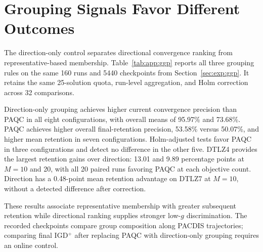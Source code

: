 \appendix
\section{Grouping Signals Favor Different Outcomes}
\label{app:ggp}
\setcounter{table}{0}
\renewcommand{\thetable}{\Alph{section}.\arabic{table}}
\renewcommand{\theHtable}{\Alph{section}.\arabic{table}}

The direction-only control separates directional convergence ranking from
representative-based membership. Table~\ref{tab:app:ggp} reports all three
grouping rules on the same 160 runs and 5440 checkpoints from
Section~\ref{sec:exp:ggp}. It retains the same 25-solution quota, run-level
aggregation, and Holm correction across 32 comparisons.

Direction-only grouping achieves higher current convergence precision than
PAQC in all eight configurations, with overall means of 95.97\% and 73.68\%.
PAQC achieves higher overall final-retention precision, 53.58\% versus 50.07\%,
and higher mean retention in seven configurations. Holm-adjusted tests favor
PAQC in three configurations and detect no difference in the other five.
DTLZ4 provides the largest retention gains over direction: 13.01 and
9.89 percentage points at $M=10$ and 20, with all 20 paired runs favoring
PAQC at each objective count. Direction has a 0.48-point mean retention
advantage on DTLZ7 at $M=10$, without a detected difference after correction.

These results associate representative membership with greater subsequent
retention while directional ranking supplies stronger low-$g$ discrimination.
The recorded checkpoints compare group composition along PACDIS trajectories;
comparing final IGD$^+$ after replacing PAQC with direction-only grouping
requires an online control.


